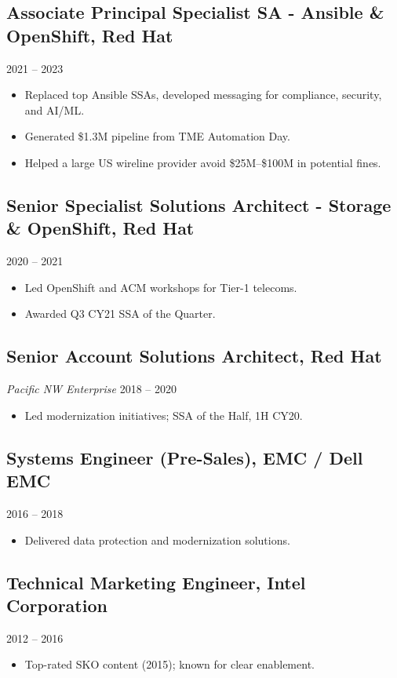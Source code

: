 \documentclass[11pt]{article}
\begin{document}
\subsection{Associate Principal Specialist SA - Ansible \& OpenShift, Red Hat}
\hfill 2021 -- 2023
\begin{itemize}[leftmargin=*]
    \item Replaced top Ansible SSAs, developed messaging for compliance, security, and AI/ML.
    \item Generated \$1.3M pipeline from TME Automation Day.
    \item Helped a large US wireline provider avoid \$25M--\$100M in potential fines.
\end{itemize}

\subsection{Senior Specialist Solutions Architect - Storage \& OpenShift, Red Hat}
\hfill 2020 -- 2021
\begin{itemize}[leftmargin=*]
    \item Led OpenShift and ACM workshops for Tier-1 telecoms.
    \item Awarded Q3 CY21 SSA of the Quarter.
\end{itemize}

\subsection{Senior Account Solutions Architect, Red Hat}
\textit{Pacific NW Enterprise} \hfill 2018 -- 2020
\begin{itemize}[leftmargin=*]
    \item Led modernization initiatives; SSA of the Half, 1H CY20.
\end{itemize}

\subsection{Systems Engineer (Pre-Sales), EMC / Dell EMC}
\hfill 2016 -- 2018
\begin{itemize}[leftmargin=*]
    \item Delivered data protection and modernization solutions.
\end{itemize}

\subsection{Technical Marketing Engineer, Intel Corporation}
\hfill 2012 -- 2016
\begin{itemize}[leftmargin=*]
    \item Top-rated SKO content (2015); known for clear enablement.
\end{itemize}
\end{document}
